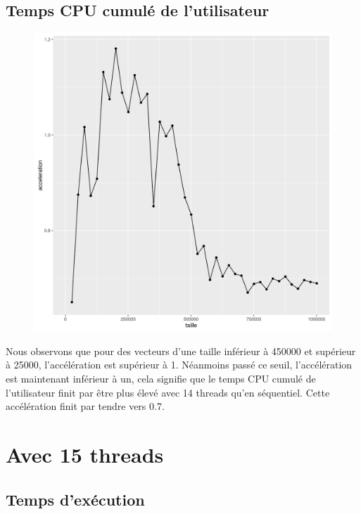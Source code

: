 \documentclass[a4paper,11pt]{scrartcl}
\begin{document}
\subsection{Temps CPU cumul\'e de l'utilisateur}
\begin{figure}[H] \center
   \includegraphics[scale=0.5] {graphes/temps_user_accel14.png}
\end{figure}
Nous observons que pour des vecteurs d'une taille inf\'erieur \`a 450000 et sup\'erieur \`a 25000, l'acc\'el\'eration est sup\'erieur \`a 1. N\'eanmoins pass\'e ce seuil,  l'acc\'el\'eration est maintenant inf\'erieur \`a un, cela signifie que le temps CPU cumul\'e de l'utilisateur finit par \^{e}tre plus \'elev\'e avec 14 threads qu'en s\'equentiel. Cette acc\'el\'eration finit par tendre vers 0.7.


\section{Avec 15 threads}
\subsection{Temps d'ex\'ecution}
\end{document}
